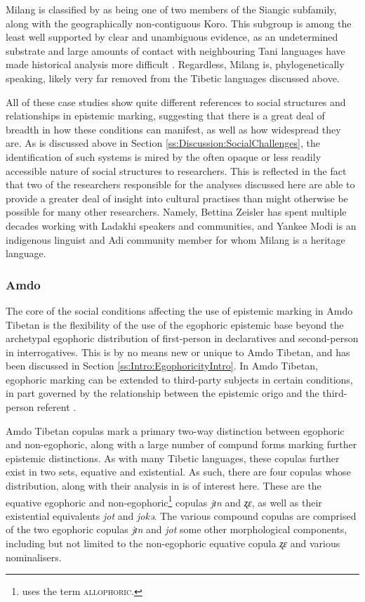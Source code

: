 Milang is classified by  as being one of two members of the Siangic subfamily, along with the geographically non-contiguous Koro. This subgroup is among the least well supported by clear and unambiguous evidence, as an undetermined substrate and large amounts of contact with neighbouring Tani languages have made historical analysis more difficult \cite{Modi2017}. Regardless, Milang is, phylogenetically speaking, likely very far removed from the Tibetic languages discussed above.

All of these case studies show quite different references to social structures and relationships in epistemic marking, suggesting that there is a great deal of breadth in how these conditions can manifest, as well as how widespread they are. As is discussed above in Section \ref{ss:Discussion:SocialChallenges}, the identification of such systems is mired by the often opaque or less readily accessible nature of social structures to researchers. This is reflected in the fact that two of the researchers responsible for the analyses discussed here are able to provide a greater deal of insight into cultural practises than might otherwise be possible for many other researchers. Namely, Bettina Zeisler has spent multiple decades working with Ladakhi speakers and communities, and Yankee Modi is an indigenous linguist and Adi community member for whom Milang is a heritage language.

\subsubsection{Amdo}\label{sss:Discussion:AmdoCase}
The core of the social conditions affecting the use of epistemic marking in Amdo Tibetan is the flexibility of the use of the egophoric epistemic base beyond the archetypal egophoric distribution of first-person in declaratives and second-person in interrogatives. This is by no means new or unique to Amdo Tibetan, and has been discussed in Section \ref{ss:Intro:EgophoricityIntro}. In Amdo Tibetan, egophoric marking can be extended to third-party subjects in certain conditions, in part governed by the relationship between the epistemic origo and the third-person referent \cite{Tribur2019}.

Amdo Tibetan copulas mark a primary two-way distinction between egophoric and non-egophoric, along with a large number of compund forms marking further epistemic distinctions. As with many Tibetic languages, these copulas further exist in two sets, equative and existential. As such, there are four copulas whose distribution, along with their analysis in  is of interest here. These are the equative egophoric and non-egophoric\footnote{ uses the term \textsc{allophoric}.} copulas \textit{jɪn} and \textit{ʐɛ}, as well as their existential equivalents \textit{jot} and \textit{jokə}. The various compound copulas are comprised of the two egophoric copulas \textit{jɪn} and \textit{jot} some other morphological components, including but not limited to the non-egophoric equative copula \textit{ʐɛ} and various nominalisers.

